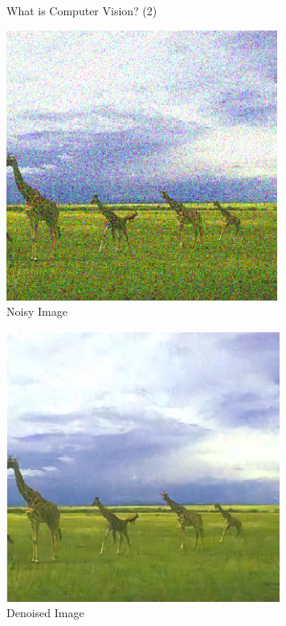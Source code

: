 \documentclass[serif, aspectratio=169]{beamer}
\begin{document}
	\begin{frame}{What is Computer Vision? (2)}
		\centering
		\begin{minipage}{0.45\textwidth}
			\centering
			\includegraphics[width=\textwidth, keepaspectratio]{pic/noisy_image.png}
			\\Noisy Image
		\end{minipage}%
		\hspace{0.05\textwidth} %
		\begin{minipage}{0.45\textwidth}
			\centering
			\includegraphics[width=\textwidth, keepaspectratio]{pic/denoised_image.png}
			\\Denoised Image
		\end{minipage}
	\end{frame}
\end{document}
